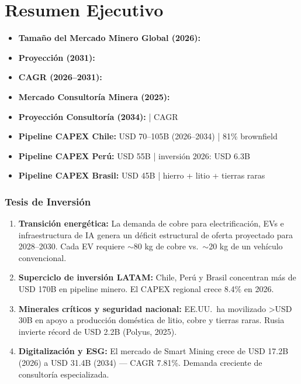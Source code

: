 \chapter{Resumen Ejecutivo}

\begin{marketdatabox}
\begin{itemize}[leftmargin=*]
    \item \textbf{Tamaño del Mercado Minero Global (2026):} 
    \item \textbf{Proyección (2031):} 
    \item \textbf{CAGR (2026--2031):} 
    \item \textbf{Mercado Consultoría Minera (2025):} 
    \item \textbf{Proyección Consultoría (2034):}  | CAGR 
    \item \textbf{Pipeline CAPEX Chile:} USD 70--105B (2026--2034) | 81\% brownfield
    \item \textbf{Pipeline CAPEX Perú:} USD 55B | inversión 2026: USD 6.3B
    \item \textbf{Pipeline CAPEX Brasil:} USD 45B | hierro + litio + tierras raras
\end{itemize}
\end{marketdatabox}

\subsection{Tesis de Inversión}

\begin{keyinsightbox}
\begin{enumerate}
    \item \textbf{Transición energética:} La demanda de cobre para electrificación, EVs e infraestructura de IA genera un déficit estructural de oferta proyectado para 2028--2030. Cada EV requiere $\sim$80 kg de cobre vs.\ $\sim$20 kg de un vehículo convencional.
    \item \textbf{Superciclo de inversión LATAM:} Chile, Perú y Brasil concentran más de USD 170B en pipeline minero. El CAPEX regional crece 8.4\% en 2026.
    \item \textbf{Minerales críticos y seguridad nacional:} EE.UU.\ ha movilizado >USD 30B en apoyo a producción doméstica de litio, cobre y tierras raras. Rusia invierte récord de USD 2.2B (Polyus, 2025).
    \item \textbf{Digitalización y ESG:} El mercado de Smart Mining crece de USD 17.2B (2026) a USD 31.4B (2034) — CAGR 7.81\%. Demanda creciente de consultoría especializada.
\end{enumerate}
\end{keyinsightbox}

